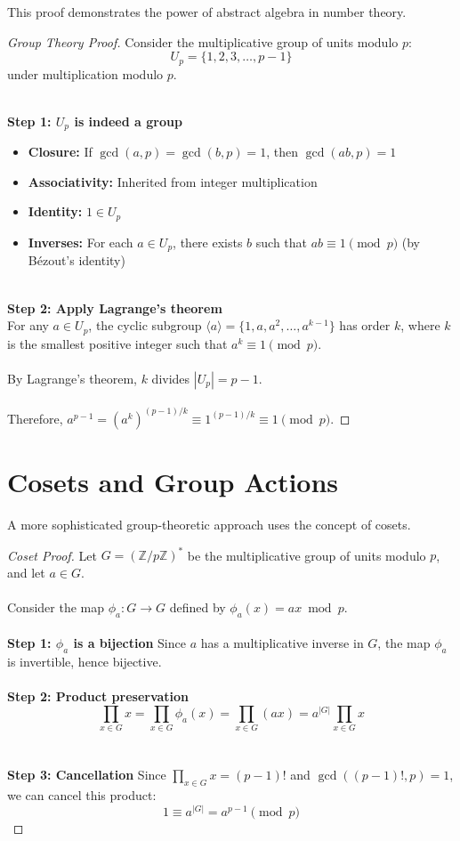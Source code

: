 \documentclass[12pt,openany]{book}
\theoremstyle{definition}
\theoremstyle{plain}
\theoremstyle{remark}
\begin{document}
This proof demonstrates the power of abstract algebra in number theory.

\begin{proof}[Group Theory Proof]
Consider the multiplicative group of units modulo $p$:
\[
U_p = \{1, 2, 3, \ldots, p-1\}
\]
\noindent
under multiplication modulo $p$.

\noindent
\\
\textbf{Step 1: $U_p$ is indeed a group}

\begin{itemize}
\item \textbf{Closure:} If $\gcd(a,p) = \gcd(b,p) = 1$, then $\gcd(ab,p) = 1$
\item \textbf{Associativity:} Inherited from integer multiplication
\item \textbf{Identity:} $1 \in U_p$
\item \textbf{Inverses:} For each $a \in U_p$, there exists $b$ such that $ab \equiv 1 \pmod{p}$ (by Bézout's identity)
\end{itemize}
\noindent
\\
\textbf{Step 2: Apply Lagrange's theorem}
\noindent
\\
For any $a \in U_p$, the cyclic subgroup $\langle a \rangle = \{1, a, a^2, \ldots, a^{k-1}\}$ has order $k$, where $k$ is the smallest positive integer such that $a^k \equiv 1 \pmod{p}$.
\noindent
\\
\\
By Lagrange's theorem, $k$ divides $|U_p| = p-1$.
\noindent
\\
\\
Therefore, $a^{p-1} = (a^k)^{(p-1)/k} \equiv 1^{(p-1)/k} \equiv 1 \pmod{p}$.
\end{proof}

\newpage

\section{Cosets and Group Actions}

A more sophisticated group-theoretic approach uses the concept of cosets.

\begin{proof}[Coset Proof]
Let $G = (\mathbb{Z}/p\mathbb{Z})^*$ be the multiplicative group of units modulo $p$, and let $a \in G$.
\noindent
\\
\\
Consider the map $\phi_a: G \to G$ defined by $\phi_a(x) = ax \bmod p$.
\noindent
\\
\\
\textbf{Step 1: $\phi_a$ is a bijection}
Since $a$ has a multiplicative inverse in $G$, the map $\phi_a$ is invertible, hence bijective.
\noindent
\\
\\
\textbf{Step 2: Product preservation}
\[
\prod_{x \in G} x = \prod_{x \in G} \phi_a(x) = \prod_{x \in G} (ax) = a^{|G|} \prod_{x \in G} x
\]
\noindent
\\
\\
\textbf{Step 3: Cancellation}
Since $\prod_{x \in G} x = (p-1)!$ and $\gcd((p-1)!, p) = 1$, we can cancel this product:
\[
1 \equiv a^{|G|} = a^{p-1} \pmod{p}
\]
\end{proof}
\end{document}
